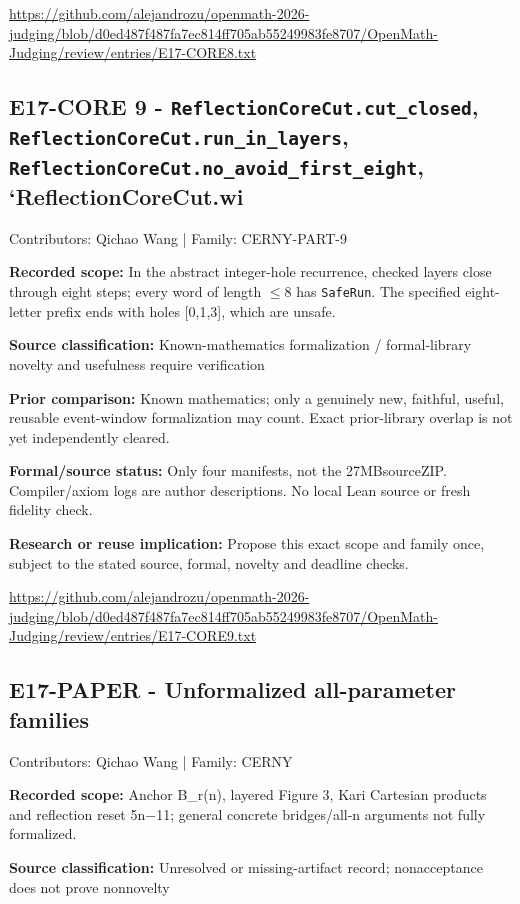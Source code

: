 \documentclass[11pt,a4paper]{article}
\begin{document}
{\small \url{https://github.com/alejandrozu/openmath-2026-judging/blob/d0ed487f487fa7ec814ff705ab55249983fe8707/OpenMath-Judging/review/entries/E17-CORE8.txt}\par}

\begin{samepage}
\subsection{E17-CORE 9  -  \texttt{ReflectionCoreCut.cut\_closed}, \texttt{ReflectionCoreCut.run\_in\_layers}, \texttt{ReflectionCoreCut.no\_avoid\_first\_eight}, `ReflectionCoreCut.wi}
{\small Contributors: Qichao Wang | Family: CERNY-PART-9\par}

\textbf{Recorded scope:} In the abstract integer-hole recurrence, checked layers close through eight steps; every word of length \ensuremath{\leq}8 has \texttt{SafeRun}. The specified eight-letter prefix ends with holes [0,1,3], which are unsafe.

\end{samepage}
\textbf{Source classification:} Known-mathematics formalization / formal-library novelty and usefulness require verification

\textbf{Prior comparison:} Known mathematics; only a genuinely new, faithful, useful, reusable event-window formalization may count. Exact prior-library overlap is not yet independently cleared.

\textbf{Formal/source status:} Only four manifests, not the 27MBsourceZIP. Compiler/axiom logs are author descriptions. No local Lean source or fresh fidelity check.

\textbf{Research or reuse implication:} Propose this exact scope and family once, subject to the stated source, formal, novelty and deadline checks.

{\small \url{https://github.com/alejandrozu/openmath-2026-judging/blob/d0ed487f487fa7ec814ff705ab55249983fe8707/OpenMath-Judging/review/entries/E17-CORE9.txt}\par}

\begin{samepage}
\subsection{E17-PAPER  -  Unformalized all-parameter families}
{\small Contributors: Qichao Wang | Family: CERNY\par}

\textbf{Recorded scope:} Anchor B\_r(n), layered Figure 3, Kari Cartesian products and reflection reset 5n\ensuremath{-}11; general concrete bridges/all-n arguments not fully formalized.

\end{samepage}
\textbf{Source classification:} Unresolved or missing-artifact record; nonacceptance does not prove nonnovelty
\end{document}
